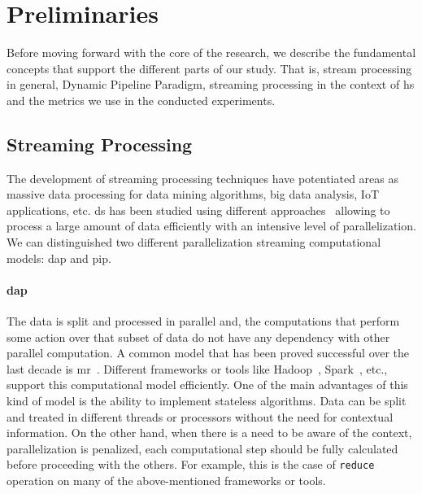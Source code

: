 \section{Preliminaries}\label{prelim}
Before moving forward with the core of the research, we describe the fundamental concepts that support the different parts of our study. That is, stream processing in general, Dynamic Pipeline Paradigm, streaming processing in the context of \acrshort{hs} and the metrics we use in the conducted experiments.

\subsection{Streaming Processing}
The development of streaming processing techniques  have potentiated areas as massive data processing for data mining algorithms, big data analysis, IoT applications, etc.  
\acrfull{ds} has been studied using different approaches~\cite{enumeratingsg, exploiting, onthefly} allowing to process a large amount of data efficiently with an intensive level of parallelization.
We can distinguished two different parallelization streaming computational models: \acrfull{dap} and \acrfull{pip}. 

\paragraph{\acrfull{dap}} The data is split and processed in parallel and, the computations that perform some action over that subset of data do not have any dependency with other parallel computation. 
A common model that has been proved successful over the last decade is \acrfull{mr}~\cite{mapreduce}. Different frameworks or tools like Hadoop~\cite{hadoop}, Spark~\cite{apachespark}, etc., support this computational model efficiently. 
One of the main advantages of this kind of model is the ability to implement stateless algorithms. Data can be split and treated in different threads or processors without the need for contextual information. 
On the other hand, when there is a need to be aware of the context, parallelization is penalized, each computational step should be fully calculated before proceeding with the others. 
For example, this is the case of \texttt{reduce} operation on many of the above-mentioned frameworks or tools.

